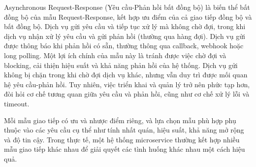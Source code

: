Asynchronous Request-Response (Yêu cầu-Phản hồi bất đồng bộ) là biến thể bất đồng bộ của mẫu Request-Response, kết hợp ưu điểm của cả giao tiếp đồng bộ và bất đồng bộ. Dịch vụ gửi yêu cầu và tiếp tục xử lý mà không chờ đợi, trong khi dịch vụ nhận xử lý yêu cầu và gửi phản hồi (thường qua hàng đợi). Dịch vụ gửi được thông báo khi phản hồi có sẵn, thường thông qua callback, webhook hoặc long polling. Một lợi ích chính của mẫu này là tránh được việc chờ đợi và blocking, cải thiện hiệu suất và khả năng phản hồi của hệ thống. Dịch vụ gửi không bị chặn trong khi chờ đợi dịch vụ khác, nhưng vẫn duy trì được mối quan hệ yêu cầu-phản hồi. Tuy nhiên, việc triển khai và quản lý trở nên phức tạp hơn, đòi hỏi cơ chế tương quan giữa yêu cầu và phản hồi, cũng như cơ chế xử lý lỗi và timeout.

Mỗi mẫu giao tiếp có ưu và nhược điểm riêng, và lựa chọn mẫu phù hợp phụ thuộc vào các yêu cầu cụ thể như tính nhất quán, hiệu suất, khả năng mở rộng và độ tin cậy. Trong thực tế, một hệ thống microservice thường kết hợp nhiều mẫu giao tiếp khác nhau để giải quyết các tình huống khác nhau một cách hiệu quả.